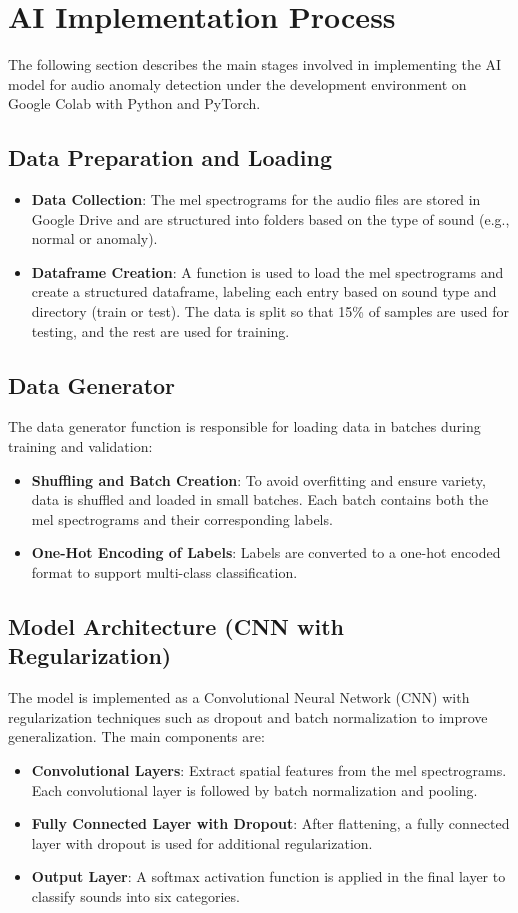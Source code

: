 \documentclass[conference]{IEEEtran}
\begin{document}
\section{AI Implementation Process}
\label{AI Impls}
The following section describes the main stages involved in implementing the AI model for audio anomaly detection under the development environment on Google Colab with Python and PyTorch.

\subsection{Data Preparation and Loading}
\begin{itemize}
    \item \textbf{Data Collection}: The mel spectrograms for the audio files are stored in Google Drive and are structured into folders based on the type of sound (e.g., normal or anomaly).
    \item \textbf{Dataframe Creation}: A function is used to load the mel spectrograms and create a structured dataframe, labeling each entry based on sound type and directory (train or test). The data is split so that 15\% of samples are used for testing, and the rest are used for training.
\end{itemize}

\subsection{Data Generator}
The data generator function is responsible for loading data in batches during training and validation:
\begin{itemize}
    \item \textbf{Shuffling and Batch Creation}: To avoid overfitting and ensure variety, data is shuffled and loaded in small batches. Each batch contains both the mel spectrograms and their corresponding labels.
    \item \textbf{One-Hot Encoding of Labels}: Labels are converted to a one-hot encoded format to support multi-class classification.
\end{itemize}

\subsection{Model Architecture (CNN with Regularization)}
The model is implemented as a Convolutional Neural Network (CNN) with regularization techniques such as dropout and batch normalization to improve generalization. The main components are:
\begin{itemize}
    \item \textbf{Convolutional Layers}: Extract spatial features from the mel spectrograms. Each convolutional layer is followed by batch normalization and pooling.
    \item \textbf{Fully Connected Layer with Dropout}: After flattening, a fully connected layer with dropout is used for additional regularization.
    \item \textbf{Output Layer}: A softmax activation function is applied in the final layer to classify sounds into six categories.
\end{itemize}
\end{document}
